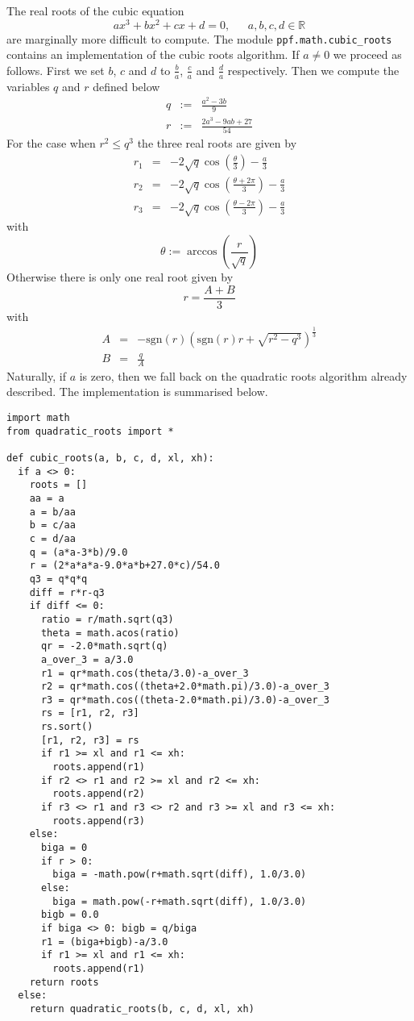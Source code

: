 The real roots of the cubic equation
\begin{equation}
ax^3+bx^2+cx+d = 0, ~~~~~~~a,b,c,d \in \mathbb R
\end{equation}
are marginally more difficult to compute. The module
\verb|ppf.math.cubic_roots| contains an implementation of the cubic
roots algorithm. If $a \ne 0$ we proceed as follows. First we set $b$,
$c$ and $d$ to $\frac{b}{a}$, $\frac{c}{a}$ and $\frac{d}{a}$
respectively. Then we compute the variables $q$ and $r$ defined below
\begin{eqnarray}
q &:=& \frac{a^2-3b}{9} \\
r &:=& \frac{2a^3-9ab+27}{54}
\end{eqnarray}
For the case when $r^2 \le q^3$ the three real roots are given by
\begin{eqnarray}
r_1 &=& -2\sqrt{q} \cos\left(\frac{\theta}{3}\right)-\frac{a}{3} \\
r_2 &=& -2\sqrt{q} \cos\left(\frac{\theta+2\pi}{3}\right)-\frac{a}{3} \\
r_3 &=& -2\sqrt{q} \cos\left(\frac{\theta-2\pi}{3}\right)-\frac{a}{3}
\end{eqnarray}
with 
\begin{equation}
\theta := \arccos\left(\frac{r}{\sqrt{q}}\right)
\end{equation}
Otherwise there is only one real root given by
\begin{equation}
r = \frac{A+B}{3}
\end{equation}
with 
\begin{eqnarray}
A &=& -\mbox{sgn}(r) \left(\mbox{sgn}(r) r+\sqrt{r^2-q^3}\right)^{\frac{1}{3}} \\
B &=& \frac{q}{A}
\end{eqnarray}
Naturally, if $a$ is zero, then we fall back on the quadratic roots
algorithm already described. The implementation is summarised below.
\begin{verbatim}
import math
from quadratic_roots import *

def cubic_roots(a, b, c, d, xl, xh):
  if a <> 0:
    roots = []
    aa = a
    a = b/aa
    b = c/aa
    c = d/aa
    q = (a*a-3*b)/9.0
    r = (2*a*a*a-9.0*a*b+27.0*c)/54.0
    q3 = q*q*q
    diff = r*r-q3
    if diff <= 0:
      ratio = r/math.sqrt(q3)
      theta = math.acos(ratio)
      qr = -2.0*math.sqrt(q)
      a_over_3 = a/3.0
      r1 = qr*math.cos(theta/3.0)-a_over_3
      r2 = qr*math.cos((theta+2.0*math.pi)/3.0)-a_over_3
      r3 = qr*math.cos((theta-2.0*math.pi)/3.0)-a_over_3
      rs = [r1, r2, r3]
      rs.sort()
      [r1, r2, r3] = rs
      if r1 >= xl and r1 <= xh:
        roots.append(r1)
      if r2 <> r1 and r2 >= xl and r2 <= xh:
        roots.append(r2) 
      if r3 <> r1 and r3 <> r2 and r3 >= xl and r3 <= xh:
        roots.append(r3) 
    else:
      biga = 0  
      if r > 0:
        biga = -math.pow(r+math.sqrt(diff), 1.0/3.0)
      else:
        biga = math.pow(-r+math.sqrt(diff), 1.0/3.0)
      bigb = 0.0
      if biga <> 0: bigb = q/biga
      r1 = (biga+bigb)-a/3.0
      if r1 >= xl and r1 <= xh:
        roots.append(r1)
    return roots
  else:
    return quadratic_roots(b, c, d, xl, xh)
\end{verbatim}
